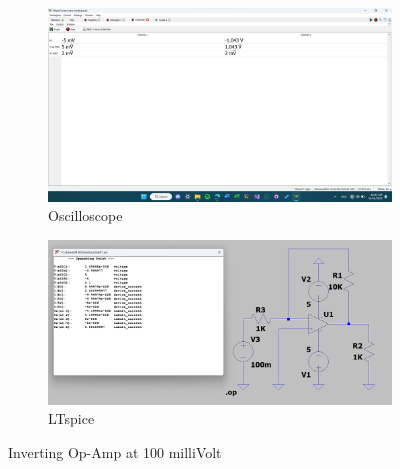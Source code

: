 \documentclass{zc-ust-hw}
\begin{document}
\begin{figure}[htpb]
  \centering
  \begin{subfigure}[b]{0.45\textwidth}
    \includegraphics[width=\textwidth]{figures/inv-opamp-100mv.png}
    \caption{Oscilloscope}
  \end{subfigure}
  \hfill
  \begin{subfigure}[b]{0.45\textwidth}
    \includegraphics[width=\textwidth]{figures/inv-opamp-100mv-lts.png}
    \caption{LTspice}
  \end{subfigure}
  \caption{Inverting Op-Amp at 100 milliVolt}
\end{figure}
\end{document}

